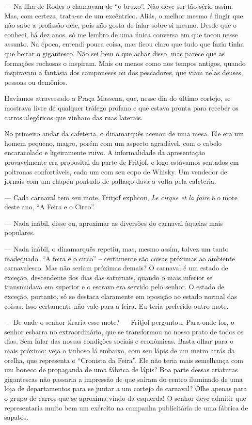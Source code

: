 --- Na ilha de Rodes o chamavam de ``o bruxo''. Não deve ser tão sério
assim. Mas, com certeza, trata-se de um excêntrico. Aliás, o melhor
mesmo é fingir que não sabe a profissão dele, pois não gosta de falar
sobre si mesmo. Desde que o conheci, há dez anos, só me lembro de uma
única conversa em que tocou nesse assunto. Na época, entendi pouca
coisa, mas ficou claro que tudo que fazia tinha que beirar o gigantesco.
Não sei bem o que achar disso, mas parece que as formações rochosas o
inspiram. Mais ou menos como nos tempos antigos, quando inspiravam a
fantasia dos camponeses ou dos pescadores, que viam nelas deuses,
pessoas ou demônios.

Havíamos atravessado a Praça Massena, que, nesse dia do último cortejo,
se mostrava livre de qualquer tráfego profano e que estava pronta para
receber os carros alegóricos que vinham das ruas laterais.

No primeiro andar da cafeteria, o dinamarquês acenou de uma mesa. Ele
era um homem pequeno, magro, porém com um aspecto agradável, com o
cabelo encaracolado e ligeiramente ruivo. A informalidade da
apresentação provavelmente era proposital da parte de Fritjof, e logo
estávamos sentados em poltronas confortáveis, cada um com seu copo de
Whisky. Um vendedor de jornais com um chapéu pontudo de palhaço dava a
volta pela cafeteria.

--- Cada carnaval tem seu mote, Fritjof explicou, \emph{Le cirque et la
foire} é o mote deste ano, ``A Feira e o Circo''.

--- Nada inábil, disse eu, aproximar as diversões do carnaval àquelas
mais populares.

--- Nada inábil, o dinamarquês repetiu, mas, mesmo assim, talvez um tanto
inadequado. ``A feira e o circo'' -- certamente são coisas próximas ao
ambiente carnavalesco. Mas não seriam próximas demais? O carnaval é um
estado de exceção, descendente dos dias das saturnais, quando o mais
inferior se transmudava em superior e o escravo era servido pelo senhor.
O estado de exceção, portanto, só se destaca claramente em oposição ao
estado normal das coisas. Isso certamente não vale para a feira. Eu
teria preferido outro mote.

--- De onde o senhor tiraria esse mote? --- Fritjof perguntou. Para onde
for, o senhor esbarra no extraordinário, que se transformou no nosso
prato de todos os dias. Sem falar das nossas condições sociais e
econômicas. Basta olhar para o mais próximo: veja o tinhoso lá embaixo,
com seu lápis de um metro atrás da orelha, que representa o ``Cronista
da Feira''. Ele não teria mais semelhança com um boneco de propaganda de
uma fábrica de lápis? Boa parte dessas criaturas gigantescas não
passaria a impressão de que saíram do centro iluminado de uma loja de
departamentos para se juntar a um cortejo de carnaval? Olhe apenas para
o grupo de carros que se aproxima vindo da esquerda! O senhor deve
admitir que representaria muito bem um exército na campanha publicitária
de uma fábrica de sapatos.

